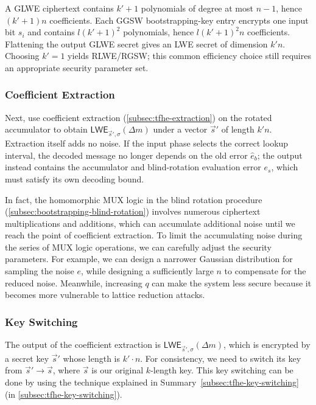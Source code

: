  A GLWE ciphertext contains $k'+1$ polynomials of degree at most $n-1$, hence $(k'+1)n$ coefficients. Each GGSW bootstrapping-key entry encrypts one input bit $s_i$ and contains $l(k'+1)^2$ polynomials, hence $l(k'+1)^2n$ coefficients. Flattening the output GLWE secret gives an LWE secret of dimension $k'n$. Choosing $k'=1$ yields RLWE/RGSW; this common efficiency choice still requires an appropriate security parameter set.

\subsubsection{Coefficient Extraction}

Next, use coefficient extraction (\autoref{subsec:tfhe-extraction}) on the rotated accumulator to obtain $\textsf{LWE}_{\vec{s}',\sigma}(\Delta m)$ under a vector $\vec{s}'$ of length $k'n$. Extraction itself adds no noise. If the input phase selects the correct lookup interval, the decoded message no longer depends on the old error $\hat e_b$; the output instead contains the accumulator and blind-rotation evaluation error $e_s$, which must satisfy its own decoding bound.

In fact, the homomorphic MUX logic in the blind rotation procedure (\autoref{subsec:bootstrapping-blind-rotation}) involves numerous ciphertext multiplications and additions, which can accumulate additional noise until we reach the point of coefficient extraction. To limit the accumulating noise during the series of MUX logic operations, we can carefully adjust the security parameters. For example, we can design a narrower Gaussian distribution for sampling the noise $e$, while designing a sufficiently large $n$ to compensate for the reduced noise. Meanwhile, increasing $q$ can make the system less secure because it becomes more vulnerable to lattice reduction attacks. 


\subsubsection{Key Switching}
\label{subsec:bootstrapping-key-switch} 

The output of the coefficient extraction is $\textsf{LWE}_{\vec{s}', \sigma}(\Delta m)$, which is encrypted by a secret key $\vec{s}'$ whose length is $k'\cdot n$. For consistency, we need to switch its key from $\vec{s}' \rightarrow \vec{s}$, where $\vec{s}$ is our original $k$-length key. This key switching can be done by using the technique explained in Summary~\ref*{subsec:tfhe-key-switching} (in \autoref{subsec:tfhe-key-switching}).



